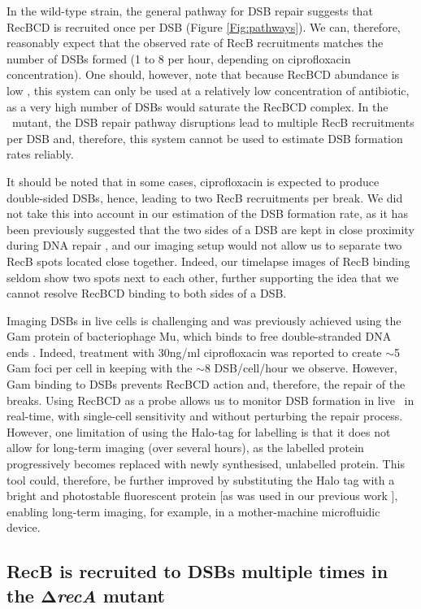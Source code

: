 In the wild-type strain, the general pathway for DSB repair suggests that RecBCD is recruited once per DSB (Figure \ref{Fig:pathways}). We can, therefore, reasonably expect that the observed rate of RecB recruitments matches the number of DSBs formed (1 to 8 per hour, depending on ciprofloxacin concentration). One should, however, note that because RecBCD abundance is low \cite{Lepore2019a}, this system can only be used at a relatively low concentration of antibiotic, as a very high number of DSBs would saturate the RecBCD complex. In the \dreca\ mutant, the DSB repair pathway disruptions lead to multiple RecB recruitments per DSB and, therefore, this system cannot be used to estimate DSB formation rates reliably. 

It should be noted that in some cases, ciprofloxacin is expected to produce double-sided DSBs, hence, leading to two RecB recruitments per break. We did not take this into account in our estimation of the DSB formation rate, as it has been previously suggested that the two sides of a DSB are kept in close proximity during DNA repair \cite{Vickridge2017,Keyamura2019}, and our imaging setup would not allow us to separate two RecB spots located close together. Indeed, our timelapse images of RecB binding seldom show two spots next to each other, further supporting the idea that we cannot resolve RecBCD binding to both sides of a DSB.

Imaging DSBs in live cells is challenging and was previously achieved using the Gam protein of bacteriophage Mu, which binds to free double-stranded DNA ends \cite{Shee2013,Pribis2019,Henrikus2020}. Indeed, treatment with 30ng/ml ciprofloxacin was reported to create $\sim$5 Gam foci per cell in keeping with the $\sim$8 DSB/cell/hour we observe. However, Gam binding to DSBs prevents RecBCD action and, therefore, the repair of the breaks. Using RecBCD as a probe allows us to monitor DSB formation in live \ecoli\ in real-time, with single-cell sensitivity and without perturbing the repair process. However, one limitation of using the Halo-tag for labelling is that it does not allow for long-term imaging (over several hours), as the labelled protein progressively becomes replaced with newly synthesised, unlabelled protein. This tool could, therefore, be further improved by substituting the Halo tag with a bright and photostable fluorescent protein [as was used in our previous work \cite{Lepore2019a}], enabling long-term imaging, for example, in a mother-machine microfluidic device.

\subsection*{RecB is recruited to DSBs multiple times in the $\mathbf{\Delta}$\emph{recA} mutant}

